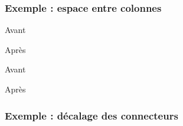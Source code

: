 		\subsubsection{Exemple : espace entre colonnes}\label{espace}


\begin{code}
\begin{fast}{Avant}
\end{fast}

\renewcommand*{\fastEspaceColonne}{6cm}	%
\begin{fast}{Après}
\end{fast}
\fastReset
\end{code}
\cqd
\begin{exemple}
\begin{fast}{Avant}
\end{fast}
\renewcommand*{\fastEspaceColonne}{6cm}
\begin{fast}{Après}
\end{fast}
\fastReset
\end{exemple}





	\subsubsection{Exemple : décalage des connecteurs}\label{decalage}

